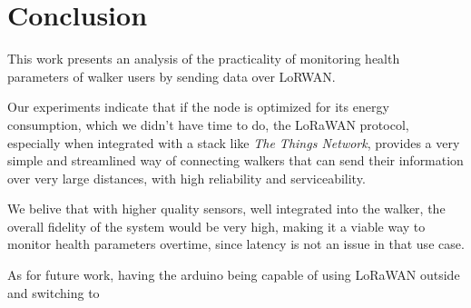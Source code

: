 \chapter{Conclusion}
\label{cha:conclusion}

This work presents an analysis of the practicality of monitoring health parameters of walker users by sending data over LoRWAN. 

Our experiments indicate that if the node is optimized for its energy consumption, which we didn't have time to do, the LoRaWAN protocol, especially when integrated with a stack like \textit{The Things Network}, provides a very simple and streamlined way of connecting walkers that can send their information over very large distances, with high reliability and serviceability. 

We belive that with higher quality sensors, well integrated into the walker, the overall fidelity of the system would be very high, making it a viable way to monitor health parameters overtime, since latency is not an issue in that use case.

As for future work, having the arduino being capable of using LoRaWAN outside and switching to 



